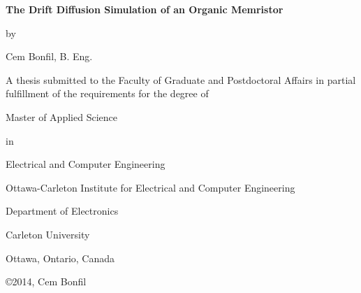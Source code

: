 \documentclass[11pt, a4paper, oneside]{Thesis} %
\begin{document}
\begin{titlepage}
\begin{center}
\LARGE
\textbf{The Drift Diffusion Simulation of an Organic Memristor}
\vspace{6 mm}
\large 
\begin{center}
by 
\vspace{6 mm}
\end{center}
\large  
Cem Bonfil, B. Eng.
\end{center}



\large  
\begin{center}
A thesis submitted to the
Faculty of Graduate and Postdoctoral Affairs
in partial fulfillment of
the requirements for the degree of
\end{center}

\vspace{6 mm}
\large  
\begin{center}
Master of Applied Science
\end{center}
\large  
\begin{center}
in
\end{center}
\large  
\begin{center}
Electrical and Computer Engineering
\end{center}

\vspace{6 mm}

\large  
\begin{center}
Ottawa-Carleton Institute for Electrical and Computer Engineering
\end{center}

\large  
\begin{center}
Department of Electronics
\end{center}
\large  
\begin{center}
Carleton University
\end{center}
\large  
\begin{center}
Ottawa, Ontario, Canada
\end{center}

\vspace{6 mm}
\large  
\begin{center}
\copyright 2014, Cem Bonfil
\end{center}

\end{titlepage}



\newpage %
\end{document}
